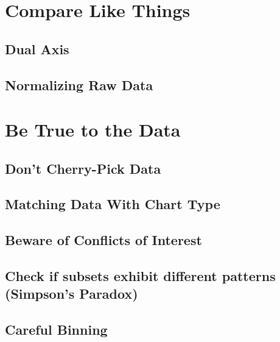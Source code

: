 \documentclass[
]{krantz}
\begin{document}
\hypertarget{compare-like-things}{%
\section{Compare Like Things}\label{compare-like-things}}

\hypertarget{dual-axis}{%
\subsection{Dual Axis}\label{dual-axis}}

\hypertarget{normalizing-raw-data}{%
\subsection{Normalizing Raw Data}\label{normalizing-raw-data}}

\hypertarget{be-true-to-the-data}{%
\section{Be True to the Data}\label{be-true-to-the-data}}

\hypertarget{dont-cherry-pick-data}{%
\subsection{Don't Cherry-Pick Data}\label{dont-cherry-pick-data}}

\hypertarget{matching-data-with-chart-type}{%
\subsection{Matching Data With Chart Type}\label{matching-data-with-chart-type}}

\hypertarget{beware-of-conflicts-of-interest}{%
\subsection{Beware of Conflicts of Interest}\label{beware-of-conflicts-of-interest}}

\hypertarget{check-if-subsets-exhibit-different-patterns-simpsons-paradox}{%
\subsection{Check if subsets exhibit different patterns (Simpson's Paradox)}\label{check-if-subsets-exhibit-different-patterns-simpsons-paradox}}

\hypertarget{careful-binning}{%
\subsection{Careful Binning}\label{careful-binning}}
\end{document}
